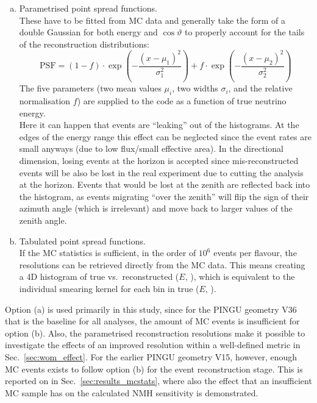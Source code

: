 \begin{enumerate}[(a)]
 \item Parametrised point spread functions.\\ These have to be fitted from MC
  data and generally take the form of a double Gaussian for both energy and
  $\cos\vartheta$ to properly account for the tails of the reconstruction 
  distributions:
  \begin{equation}
   \mathrm{PSF} = (1-f)\cdot \exp\left(-\frac{(x-\mu_1)^2}{\sigma_1^2}\right)
                  + f\cdot \exp\left(-\frac{(x-\mu_2)^2}{\sigma_2^2}\right)
   \label{eqn:reco_param}
  \end{equation}
  The five parameters (two mean values $\mu_i$, two widths $\sigma_i$, and the
  relative normalisation $f$) are supplied to the code as a function of true
  neutrino energy.\\
  Here it can happen that events are ``leaking'' out of the histograms. At
  the edges of the energy range this effect can be neglected since the event
  rates are small anyways (due to low flux/small effective area). In the
  directional dimension, losing events at the horizon is accepted since
  mis-reconstructed events will be also be lost in the real experiment due to
  cutting the analysis at the horizon. Events that would be lost at the zenith
  are reflected back into the histogram, as events migrating ``over the
  zenith'' will flip the sign of their azimuth angle (which is irrelevant) and
  move back to larger values of the zenith angle.
 \item Tabulated point spread functions.\\ If the MC statistics is sufficient,
  \ie in the order of $10^6$ events per flavour, the resolutions can be
  retrieved directly from the MC data. This means creating a 4D histogram of
  true vs.\ reconstructed ($E$, \coszen), which is equivalent to
  the individual smearing kernel for each bin in true ($E$, \coszen).
  \end{enumerate}
Option (a) is used primarily in this study, since for the PINGU geometry
V36 that is the baseline for all analyses, the amount of MC events is
insufficient for option (b). Also, the parametrised reconstruction resolutions
make it possible to investigate the effects of an improved resolution within a
well-defined metric in Sec.~\ref{sec:wom_effect}.
For the earlier PINGU geometry V15, however, enough MC events exists to
follow option (b) for the event reconstruction stage.
This is reported on in Sec.~\ref{sec:results_mcstats}, where also the effect
that an insufficient MC sample has on the calculated NMH sensitivity is
demonstrated.

